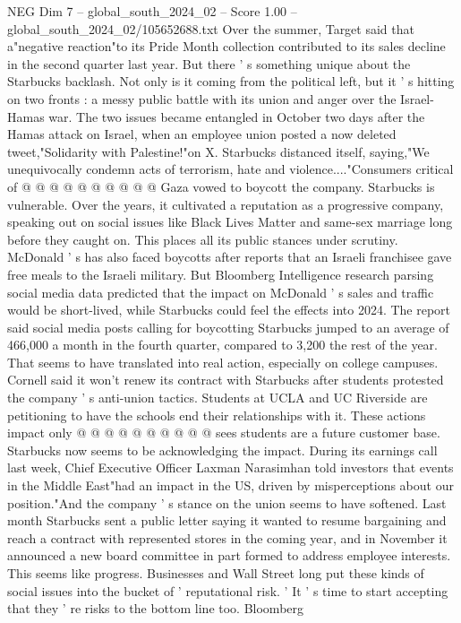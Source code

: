 \begin{textsample}{NEG Dim 7 – global\_south\_2024\_02 – Score 1.00 – global\_south\_2024\_02/105652688.txt}
Over the summer, Target said that a"negative reaction"to its Pride Month collection contributed to its sales decline in the second quarter last year.
But there ' s something unique about the Starbucks backlash.
Not only is it coming from the political left, but it ' s hitting on two fronts : a messy public battle with its union and anger over the Israel-Hamas war.
The two issues became entangled in October two days after the Hamas attack on Israel, when an employee union posted a now deleted tweet,"Solidarity with Palestine!"on X.
Starbucks distanced itself, saying,"We unequivocally condemn acts of terrorism, hate and violence...."Consumers critical of @ @ @ @ @ @ @ @ @ @ Gaza vowed to boycott the company.
Starbucks is vulnerable.
Over the years, it cultivated a reputation as a progressive company, speaking out on social issues like Black Lives Matter and same-sex marriage long before they caught on.
This places all its public stances under scrutiny.
McDonald ' s has also faced boycotts after reports that an Israeli franchisee gave free meals to the Israeli military.
But Bloomberg Intelligence research parsing social media data predicted that the impact on McDonald ' s sales and traffic would be short-lived, while Starbucks could feel the effects into 2024.
The report said social media posts calling for boycotting Starbucks jumped to an average of 466,000 a month in the fourth quarter, compared to 3,200 the rest of the year.
That seems to have translated into real action, especially on college campuses.
Cornell said it won't renew its contract with Starbucks after students protested the company ' s anti-union tactics.
Students at UCLA and UC Riverside are petitioning to have the schools end their relationships with it.
These actions impact only @ @ @ @ @ @ @ @ @ @ sees students are a future customer base.
Starbucks now seems to be acknowledging the impact.
During its earnings call last week, Chief Executive Officer Laxman Narasimhan told investors that events in the Middle East"had an impact in the US, driven by misperceptions about our position."And the company ' s stance on the union seems to have softened.
Last month Starbucks sent a public letter saying it wanted to resume bargaining and reach a contract with represented stores in the coming year, and in November it announced a new board committee in part formed to address employee interests.
This seems like progress.
Businesses and Wall Street long put these kinds of social issues into the bucket of ' reputational risk. ' It ' s time to start accepting that they ' re risks to the bottom line too.
Bloomberg

\end{textsample}
